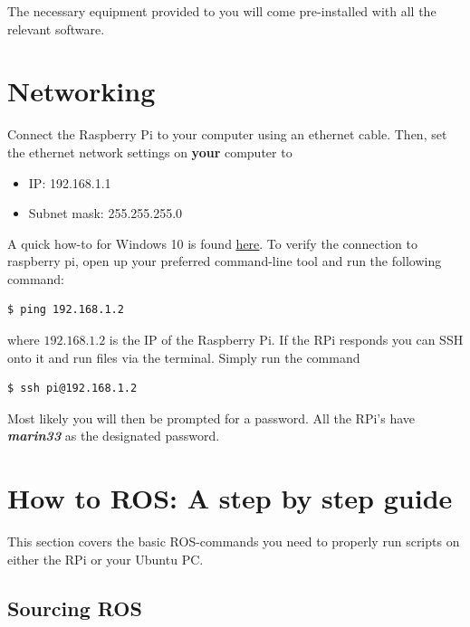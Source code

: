 \documentclass{ol-softwaremanual}
\begin{document}
The necessary equipment provided to you will come pre-installed with all the relevant software.

\section{Networking}

Connect the Raspberry Pi to your computer using an ethernet cable. Then, set the ethernet network settings on \textbf{your} computer to

\begin{itemize}
    \item IP: 192.168.1.1
    \item Subnet mask: 255.255.255.0
\end{itemize}

A quick how-to for Windows 10 is found \underline{\href{https://se.mathworks.com/help/supportpkg/usrpradio/ug/configure-ethernet-connection-manually-on-windows-10.html}{here}}. To verify the connection to raspberry pi, open up your preferred command-line tool and run the following command: 

\begin{lstlisting}[language=bash,basicstyle=\mlttfamily, breaklines=true]
  $ ping 192.168.1.2
\end{lstlisting}

where $192.168.1.2$ is the IP of the Raspberry Pi. If  the RPi responds you can SSH onto it and run files via the terminal. Simply run the command

\begin{lstlisting}[language=bash,basicstyle=\mlttfamily, breaklines=true]
  $ ssh pi@192.168.1.2
\end{lstlisting}

Most likely you will then be prompted for a password. All the RPi's have \textbf{\textit{marin33}} as the designated password.

\section{How to ROS: A step by step guide}

This section covers the basic ROS-commands you need to properly run scripts on either the RPi or your Ubuntu PC. 

\subsection{Sourcing ROS}
\end{document}
